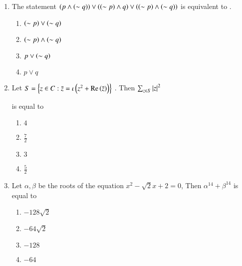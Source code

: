 \documentclass[journal]{IEEEtran}
\theoremstyle{remark}
\begin{document}
\begin{enumerate}
\hfill{}

\begin{multicols}{4}
\begin{enumerate}
\item $904$
\item $916$
\item $912$
\item $920$
\end{enumerate}
\end{multicols}

\item The statement $\left(p\land\left(\sim q\right)\right)\lor\left(\left(\sim p\right)\land q\right)\lor\left(\left(\sim p\right)\land \left(\sim q\right)\right)$ is equivalent to .

	\hfill{}

\begin{multicols}{4}
\begin{enumerate}
\item $\left(\sim p\right)\lor\left(\sim q\right)$
\item $\left(\sim p\right)\land\left(\sim q\right)$
\item $p \lor\left(\sim q\right)$
\item $p \lor q$
\end{enumerate}
\end{multicols}

\item Let $S=\left\{z \in C:\Bar{z}=\iota\left(z^2+\text{Re}\left(\Bar{z}\right)\right)\right\}$ . Then $\sum_{z\in S}^{} {\left\vert z\right\vert}^2$

is equal to \hfill{}

\begin{multicols}{4}
\begin{enumerate}
\item $4$
\item $\frac{7}{2}$
\item $3$
\item $\frac{5}{2}$
\end{enumerate}
\end{multicols}

\item Let $\alpha , \beta$ be the roots of the equation $x^2- \sqrt{2}x+2=0$, Then $\alpha^{14}+\beta^{14}$ is equal to
	
	\hfill{}

\begin{multicols}{4}
\begin{enumerate}
\item $-128\sqrt{2}$
\item $-64\sqrt{2}$
\item $-128$
\item $-64$
\end{enumerate}
\end{multicols}


\end{enumerate}
\end{document}
